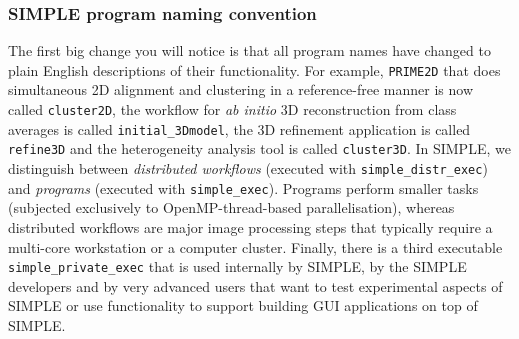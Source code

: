 \documentclass[a4paper,11pt]{article}
\newcommand{\prgname}[1]{\textcolor{NavyBlue}{\texttt{#1}}}
\begin{document}
\subsubsection{SIMPLE program naming convention}
The first big change you will notice is that all program names have changed to plain English descriptions of their functionality.  For example, \prgname{PRIME2D} that does simultaneous 2D alignment and clustering in a reference-free manner is now called \prgname{cluster2D}, the workflow for \textit{ab initio} 3D reconstruction from class averages is called \prgname{initial\_3Dmodel}, the 3D refinement application is called \prgname{refine3D} and the heterogeneity analysis tool is called \prgname{cluster3D}. In SIMPLE, we distinguish between \textit{distributed workflows} (executed with \texttt{simple\_distr\_exec}) and \textit{programs} (executed with \texttt{simple\_exec}). Programs perform smaller tasks (subjected exclusively to OpenMP-thread-based parallelisation), whereas distributed workflows are major image processing steps that typically require a multi-core workstation or a computer cluster. Finally, there is a third executable \texttt{simple\_private\_exec} that is used internally by SIMPLE, by the SIMPLE developers and by very advanced users that want to test experimental aspects of SIMPLE or use functionality to support building GUI applications on top of SIMPLE.
\end{document}
